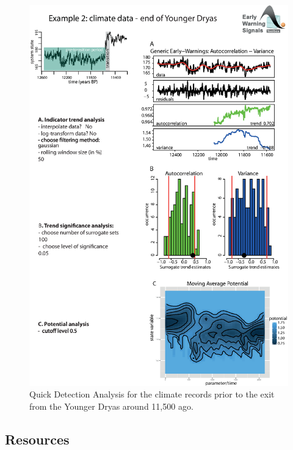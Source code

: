 \documentclass[12pt,a4paper,final]{article}
\begin{document}
\begin{figure}[h]
\begin{center}
\includegraphics[scale=0.8]{fig_3_climatedata.eps}
\caption{Quick Detection Analysis for the climate records prior to the exit from the Younger Dryas around 11,500 ago.}
\end{center}
\label{fig:QDA_climate}
\end{figure}

\subsection{Resources} 
\end{document}
